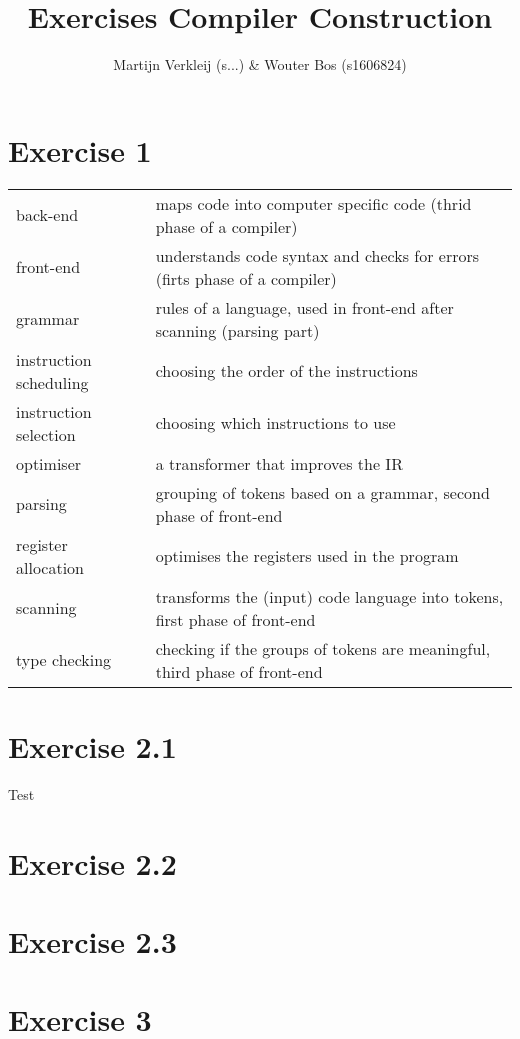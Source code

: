 \documentclass[11pt]{article} %
\title{Exercises Compiler Construction}
\author{Martijn Verkleij (s...) \& Wouter Bos (s1606824)}
\begin{document}
\maketitle

\section*{Exercise 1}
\begin{tabular}{ll}
back-end					& maps code into computer specific code (thrid phase of a compiler)				\\
front-end					& understands code syntax and checks for errors (firts phase of a compiler)		\\
grammar						& rules of a language, used in front-end after scanning (parsing part)			\\
instruction scheduling		& choosing the order of the instructions										\\
instruction selection		& choosing which instructions to use											\\
optimiser					& a transformer that improves the IR											\\
parsing						& grouping of tokens based on a grammar, second phase of front-end				\\
register allocation			& optimises the registers used in the program									\\
scanning					& transforms the (input) code language into tokens, first phase of front-end	\\
type checking				& checking if the groups of tokens are meaningful, third phase of front-end		\\
\end{tabular}

\section*{Exercise 2.1}
Test

\section*{Exercise 2.2}

\section*{Exercise 2.3}

\section*{Exercise 3}
\end{document}
